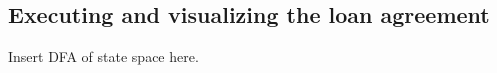 \documentclass{article}
\begin{document}





\subsection{Executing and visualizing the loan agreement}
Insert DFA of state space here.

\end{document}
